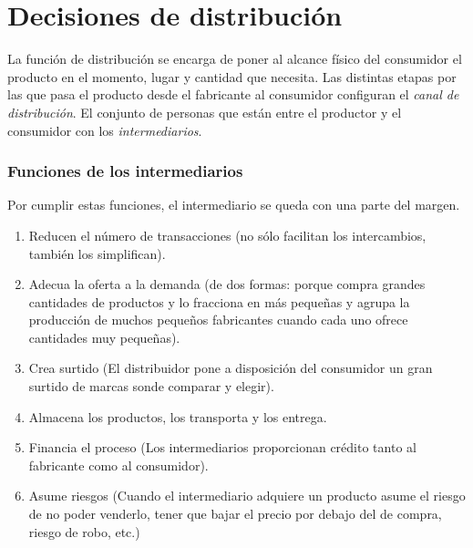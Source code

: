 \documentclass[10pt,a4paper,spanish]{report}
\begin{document}
	\section{\textcolor[rgb]{0.1,0.2,0.4}Decisiones de distribución}

		La función de distribución se encarga de poner al alcance físico del consumidor el producto en el momento, lugar y cantidad que necesita. Las distintas etapas por las que pasa el producto desde el fabricante al consumidor configuran el \textit{\textcolor[rgb]{0.1,0.2,0.4}{canal de distribución}}. El conjunto de personas que están entre el productor y el consumidor con los \textit{\textcolor[rgb]{0.1,0.2,0.4}{intermediarios}}. 

		\subsubsection{\textcolor[rgb]{0.1,0.2,0.4}Funciones de los intermediarios}

			Por cumplir estas funciones, el intermediario se queda con una parte del margen.

			\begin{enumerate}
				\item Reducen el número de transacciones (no sólo facilitan los intercambios, también los simplifican).
				\item Adecua la oferta a la demanda (de dos formas: porque compra grandes cantidades de productos y lo fracciona en más pequeñas y agrupa la producción de muchos pequeños fabricantes cuando cada uno ofrece cantidades muy pequeñas).
				\item Crea surtido (El distribuidor pone a disposición del consumidor un gran surtido de marcas sonde comparar y elegir).
				\item Almacena los productos, los transporta y los entrega.
				\item Financia el proceso (Los intermediarios proporcionan crédito tanto al fabricante como al consumidor).
				\item Asume riesgos (Cuando el intermediario adquiere un producto asume el riesgo de no poder venderlo, tener que bajar el precio por debajo del de compra, riesgo de robo, etc.)
			\end{enumerate}
\end{document}
